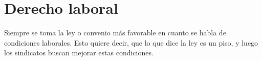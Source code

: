 \documentclass[../main.tex]{subfiles}
\begin{document}
\section{Derecho laboral}

Siempre se toma la ley o convenio más favorable en cuanto se habla de 
condiciones laborales. Esto quiere decir, que lo que dice la ley es un piso,
y luego los sindicatos buscan mejorar estas condiciones.
\end{document}
